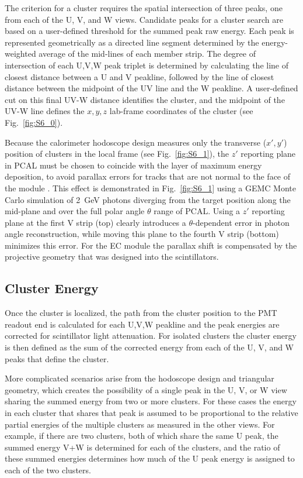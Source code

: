 The criterion for a cluster requires the spatial intersection of three peaks, one from each of the U, V, and W
views. Candidate peaks for a cluster search are based on a user-defined threshold for the summed peak raw
energy. Each peak is represented geometrically as a directed line segment determined by the energy-weighted
average of the mid-lines of each member strip. The degree of intersection of each U,V,W peak triplet is
determined by calculating the line of closest distance between a U and V peakline, followed by the line of closest
distance between the midpoint of the UV line and the W peakline. A user-defined cut on this final UV-W distance
identifies the cluster, and the midpoint of the UV-W line defines the $x,y,z$ lab-frame coordinates of the cluster
(see Fig.~\ref{fig:S6_0}).  

Because the calorimeter hodoscope design measures only the transverse ($x',y'$) position of clusters in the local
frame (see Fig.~\ref{fig:S6_1}), the $z'$ reporting plane in PCAL must be chosen to coincide with the layer of
maximum energy deposition, to avoid parallax errors for tracks that are not normal to the face of the module
\cite{nima2018}. This effect is demonstrated in Fig.~\ref{fig:S6_1} using a GEMC Monte Carlo simulation
\cite{nim:sim} of 2~GeV photons diverging from the target position along the mid-plane and over the full polar
angle $\theta$ range of PCAL. Using a $z'$ reporting plane at the first V strip (top) clearly introduces a
$\theta$-dependent error in photon angle reconstruction, while moving this plane to the fourth V strip (bottom)
minimizes this error. For the EC module the parallax shift is compensated by the projective geometry that was
designed into the scintillators.   

\subsection {Cluster Energy}

Once the cluster is localized, the path from the cluster position to the PMT readout end is calculated for each
U,V,W peakline and the peak energies are corrected for scintillator light attenuation. For isolated clusters the
cluster energy is then defined as the sum of the corrected energy from each of the U, V, and W peaks that define
the cluster.  

More complicated scenarios arise from the hodoscope design and triangular geometry, which creates the possibility
of a single peak in the U, V, or W view sharing the summed energy from two or more clusters. For these cases the
energy in each cluster that shares that peak is assumed to be proportional to the relative partial energies of the
multiple clusters as measured in the other views. For example, if there are two clusters, both of which share the
same U peak, the summed energy V+W is determined for each of the clusters, and the ratio of these summed
energies determines how much of the U peak energy is  assigned to each of the two clusters.  

